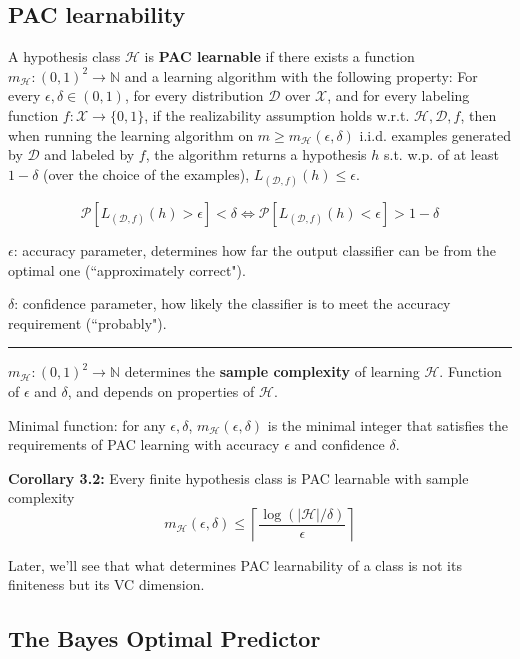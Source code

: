 \subsection{PAC learnability}

A hypothesis class $\mathcal{H}$ is \textbf{PAC learnable} if there exists a function $m_{\mathcal{H}} : (0, 1)^2 \rightarrow \mathbb{N}$ and a learning algorithm with the following property: For every $\epsilon, \delta \in (0, 1)$, for every distribution $\mathcal{D}$ over $\mathcal{X}$, and for every labeling function $f : \mathcal{X} \rightarrow \{0, 1\}$, if the realizability assumption holds w.r.t. $\mathcal{H}, \mathcal{D}, f$, then when running the learning algorithm on $m \geq m_{\mathcal{H}}(\epsilon, \delta)$ i.i.d. examples generated by $\mathcal{D}$ and labeled by $f$, the algorithm returns a hypothesis $h$ s.t. w.p. of at least $1 - \delta$ (over the choice of the examples), $L_{(\mathcal{D}, f)}(h) \leq \epsilon$.

$$\mathcal{P}[L_{(\mathcal{D}, f)}(h) > \epsilon] < \delta \Longleftrightarrow \mathcal{P}[L_{(\mathcal{D}, f)}(h) < \epsilon] > 1 - \delta$$

$\epsilon$: accuracy parameter, determines how far the output classifier can be from the optimal one (``approximately correct").

$\delta$: confidence parameter, how likely the classifier is to meet the accuracy requirement (``probably").

\medskip

\hrule height 0.06pt

$m_{\mathcal{H}}: (0, 1)^2 \rightarrow \mathbb{N}$ determines the \textbf{sample complexity} of learning $\mathcal{H}$. Function of $\epsilon$ and $\delta$, and depends on properties of $\mathcal{H}$.

Minimal function: for any $\epsilon, \delta$, $m_{\mathcal{H}}(\epsilon, \delta)$ is the minimal integer that satisfies the requirements of PAC learning with accuracy $\epsilon$ and confidence $\delta$.

\textbf{Corollary 3.2:} Every finite hypothesis class is PAC learnable with sample complexity
$$m_{\mathcal{H}} (\epsilon, \delta) \leq \left\lceil \frac{\log(|\mathcal{H}|/\delta)}{\epsilon} \right\rceil$$

Later, we'll see that what determines PAC learnability of a class is not its finiteness but its VC dimension.

\subsection{The Bayes Optimal Predictor}


